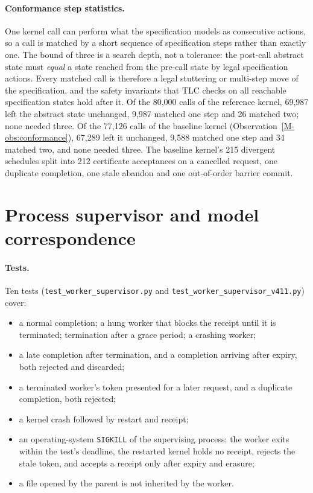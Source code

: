 \documentclass[pdflatex,sn-mathphys-num]{sn-jnl}
\newcommand{\code}[1]{\texttt{#1}}
\newcommand{\fpath}[1]{\nolinkurl{#1}}%
\begin{document}
\paragraph{Conformance step statistics.}
One kernel call can perform what the specification models as consecutive actions, so a call is matched by a short sequence of specification steps rather than exactly one. The bound of three is a search depth, not a tolerance: the post-call abstract state must \emph{equal} a state reached from the pre-call state by legal specification actions. Every matched call is therefore a legal stuttering or multi-step move of the specification, and the safety invariants that TLC checks on all reachable specification states hold after it. Of the 80,000 calls of the reference kernel, 69,987 left the abstract state unchanged, 9,987 matched one step and 26 matched two; none needed three. Of the 77,126 calls of the baseline kernel (Observation~\ref{M-obs:conformance}), 67,289 left it unchanged, 9,588 matched one step and 34 matched two, and none needed three. The baseline kernel's 215 divergent schedules split into 212 certificate acceptances on a cancelled request, one duplicate completion, one stale abandon and one out-of-order barrier commit.

\section{Process supervisor and model correspondence}\label{sec:s-supervisor}

\paragraph{Tests.}
Ten tests (\fpath{test_worker_supervisor.py} and \fpath{test_worker_supervisor_v411.py}) cover:
\begin{itemize}
\item a normal completion; a hung worker that blocks the receipt until it is terminated; termination after a grace period; a crashing worker;
\item a late completion after termination, and a completion arriving after expiry, both rejected and discarded;
\item a terminated worker's token presented for a later request, and a duplicate completion, both rejected;
\item a kernel crash followed by restart and receipt;
\item an operating-system \code{SIGKILL} of the supervising process: the worker exits within the test's deadline, the restarted kernel holds no receipt, rejects the stale token, and accepts a receipt only after expiry and erasure;
\item a file opened by the parent is not inherited by the worker.
\end{itemize}
\end{document}

